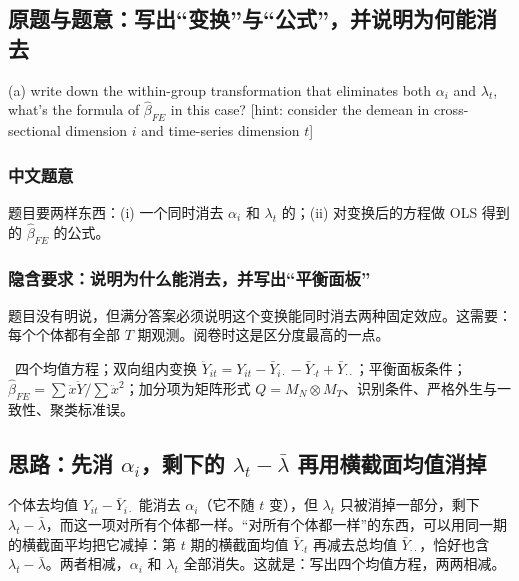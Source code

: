 \subsection{原题与题意：写出“变换”与“公式”，并说明为何能消去}

\begin{tcolorbox}[bxbase,colback=ceng!3,colframe=ceng,boxed title style={colback=ceng},fontupper=\small,title={原题 (1)(a)}]
(a) write down the within-group transformation that eliminates both $\alpha_i$ and $\lambda_t$, what's the formula of $\hat\beta_{FE}$ in this case? [hint: consider the demean in cross-sectional dimension $i$ and time-series dimension $t$]
\end{tcolorbox}

\subsubsection{中文题意}
题目要两样东西：(i) 一个同时消去 $\alpha_i$ 和 $\lambda_t$ 的；(ii) 对变换后的方程做 OLS 得到的 $\hat\beta_{FE}$ 的公式。

\subsubsection{隐含要求：说明为什么能消去，并写出“平衡面板”}
题目没有明说，但满分答案必须说明这个变换能同时消去两种固定效应。这需要：每个个体都有全部 $T$ 期观测。阅卷时这是区分度最高的一点。

\begin{keypt}[1(a) 的考点]
\tagexam\ 四个均值方程；双向组内变换 $\ddot Y_{it}=Y_{it}-\bar Y_{i\cdot}-\bar Y_{\cdot t}+\bar Y_{\cdot\cdot}$；平衡面板条件；$\hat\beta_{FE}=\sum\ddot x\ddot Y/\sum\ddot x^2$；加分项为矩阵形式 $Q=M_N\otimes M_T$、识别条件、严格外生与一致性、聚类标准误。
\end{keypt}

\subsection{思路：先消 \texorpdfstring{$\alpha_i$}{alpha\_i}，剩下的 \texorpdfstring{$\lambda_t-\bar\lambda$}{lambda\_t - lambda-bar} 再用横截面均值消掉}

个体去均值 $Y_{it}-\bar Y_{i\cdot}$ 能消去 $\alpha_i$（它不随 $t$ 变），但 $\lambda_t$ 只被消掉一部分，剩下 $\lambda_t-\bar\lambda$，而这一项对所有个体都一样。“对所有个体都一样”的东西，可以用同一期的横截面平均把它减掉：第 $t$ 期的横截面均值 $\bar Y_{\cdot t}$ 再减去总均值 $\bar Y_{\cdot\cdot}$，恰好也含 $\lambda_t-\bar\lambda$。两者相减，$\alpha_i$ 和 $\lambda_t$ 全部消失。这就是：写出四个均值方程，两两相减。

